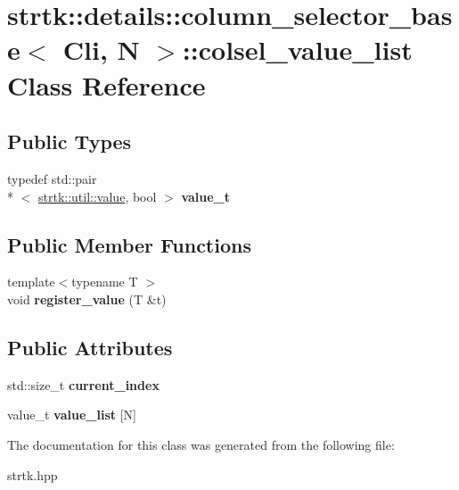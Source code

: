 \hypertarget{classstrtk_1_1details_1_1column__selector__base_1_1colsel__value__list}{\section{strtk\-:\-:details\-:\-:column\-\_\-selector\-\_\-base$<$ Cli, N $>$\-:\-:colsel\-\_\-value\-\_\-list Class Reference}
\label{classstrtk_1_1details_1_1column__selector__base_1_1colsel__value__list}
}
\subsection*{Public Types}
\begin{DoxyCompactItemize}
\item 
\hypertarget{classstrtk_1_1details_1_1column__selector__base_1_1colsel__value__list_a0ac46fb0e68f3612a28a1f297d19d8cb}{typedef std\-::pair\\*
$<$ \hyperlink{classstrtk_1_1util_1_1value}{strtk\-::util\-::value}, bool $>$ {\bfseries value\-\_\-t}}\label{classstrtk_1_1details_1_1column__selector__base_1_1colsel__value__list_a0ac46fb0e68f3612a28a1f297d19d8cb}

\end{DoxyCompactItemize}
\subsection*{Public Member Functions}
\begin{DoxyCompactItemize}
\item 
\hypertarget{classstrtk_1_1details_1_1column__selector__base_1_1colsel__value__list_a93492ca8d002d690e8de658ca84fe849}{{\footnotesize template$<$typename T $>$ }\\void {\bfseries register\-\_\-value} (T \&t)}\label{classstrtk_1_1details_1_1column__selector__base_1_1colsel__value__list_a93492ca8d002d690e8de658ca84fe849}

\end{DoxyCompactItemize}
\subsection*{Public Attributes}
\begin{DoxyCompactItemize}
\item 
\hypertarget{classstrtk_1_1details_1_1column__selector__base_1_1colsel__value__list_a9cc9f5a3bbc6c55539a7686bf0af3432}{std\-::size\-\_\-t {\bfseries current\-\_\-index}}\label{classstrtk_1_1details_1_1column__selector__base_1_1colsel__value__list_a9cc9f5a3bbc6c55539a7686bf0af3432}

\item 
\hypertarget{classstrtk_1_1details_1_1column__selector__base_1_1colsel__value__list_aa0b442681593e9a746f85169b87f5c38}{value\-\_\-t {\bfseries value\-\_\-list} \mbox{[}N\mbox{]}}\label{classstrtk_1_1details_1_1column__selector__base_1_1colsel__value__list_aa0b442681593e9a746f85169b87f5c38}

\end{DoxyCompactItemize}


The documentation for this class was generated from the following file\-:\begin{DoxyCompactItemize}
\item 
strtk.\-hpp\end{DoxyCompactItemize}
